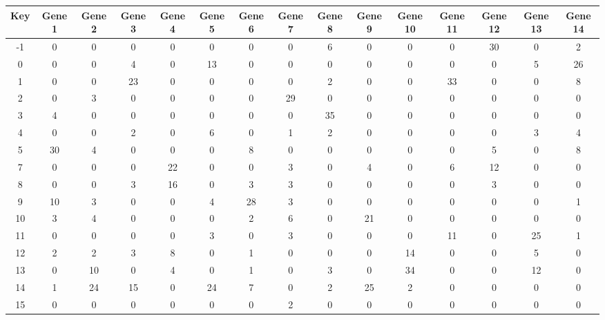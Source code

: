 \begin{tabular}{|c|c|c|c|c|c|c|c|c|c|c|c|c|c|c|}
\hline
Key & Gene 1 & Gene 2 & Gene 3 & Gene 4 & Gene 5 & Gene 6 & Gene 7 & Gene 8 & Gene 9 & Gene 10 & Gene 11 & Gene 12 & Gene 13 & Gene 14 \\
\hline
-1 & 0 & 0 & 0 & 0 & 0 & 0 & 0 & 6 & 0 & 0 & 0 & 30 & 0 & 2 \\
0 & 0 & 0 & 4 & 0 & 13 & 0 & 0 & 0 & 0 & 0 & 0 & 0 & 5 & 26 \\
1 & 0 & 0 & 23 & 0 & 0 & 0 & 0 & 2 & 0 & 0 & 33 & 0 & 0 & 8 \\
2 & 0 & 3 & 0 & 0 & 0 & 0 & 29 & 0 & 0 & 0 & 0 & 0 & 0 & 0 \\
3 & 4 & 0 & 0 & 0 & 0 & 0 & 0 & 35 & 0 & 0 & 0 & 0 & 0 & 0 \\
4 & 0 & 0 & 2 & 0 & 6 & 0 & 1 & 2 & 0 & 0 & 0 & 0 & 3 & 4 \\
5 & 30 & 4 & 0 & 0 & 0 & 8 & 0 & 0 & 0 & 0 & 0 & 5 & 0 & 8 \\
7 & 0 & 0 & 0 & 22 & 0 & 0 & 3 & 0 & 4 & 0 & 6 & 12 & 0 & 0 \\
8 & 0 & 0 & 3 & 16 & 0 & 3 & 3 & 0 & 0 & 0 & 0 & 3 & 0 & 0 \\
9 & 10 & 3 & 0 & 0 & 4 & 28 & 3 & 0 & 0 & 0 & 0 & 0 & 0 & 1 \\
10 & 3 & 4 & 0 & 0 & 0 & 2 & 6 & 0 & 21 & 0 & 0 & 0 & 0 & 0 \\
11 & 0 & 0 & 0 & 0 & 3 & 0 & 3 & 0 & 0 & 0 & 11 & 0 & 25 & 1 \\
12 & 2 & 2 & 3 & 8 & 0 & 1 & 0 & 0 & 0 & 14 & 0 & 0 & 5 & 0 \\
13 & 0 & 10 & 0 & 4 & 0 & 1 & 0 & 3 & 0 & 34 & 0 & 0 & 12 & 0 \\
14 & 1 & 24 & 15 & 0 & 24 & 7 & 0 & 2 & 25 & 2 & 0 & 0 & 0 & 0 \\
15 & 0 & 0 & 0 & 0 & 0 & 0 & 2 & 0 & 0 & 0 & 0 & 0 & 0 & 0 \\
\hline
\end{tabular}